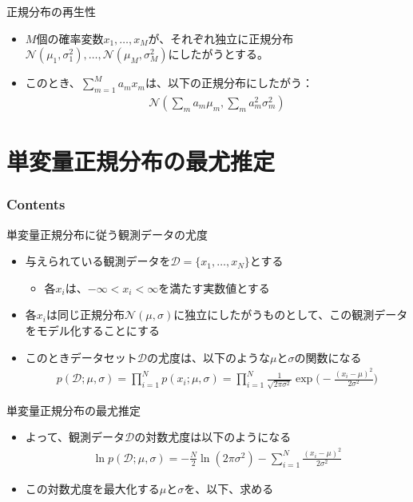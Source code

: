 \documentclass[aspectratio=169,unicode,dvipdfmx,14pt]{beamer}
\begin{document}
\begin{frame}{正規分布の再生性}
\begin{itemize}
\item $M$個の確率変数$x_1,\ldots,x_M$が、それぞれ独立に正規分布$\mathcal{N}(\mu_1,\sigma_1^2), 
\ldots, \mathcal{N}(\mu_M,\sigma_M^2)$にしたがうとする。
\item このとき、$\sum_{m=1}^M a_m x_m$は、以下の正規分布にしたがう：
\begin{align}
\mathcal{N}(\sum_m a_m \mu_m, \sum_m a_m^2 \sigma_m^2)
\end{align}
\end{itemize}
\end{frame}

\section{単変量正規分布の最尤推定}

\begin{frame}\frametitle{Contents}
\Large \tableofcontents[currentsection]
\end{frame}

\begin{frame}{単変量正規分布に従う観測データの尤度}
\begin{itemize}
\item 与えられている観測データを$\mathcal{D}=\{x_1,\ldots,x_N\}$とする
\begin{itemize}
\item 各$x_i$は、$-\infty < x_i < \infty$を満たす実数値とする
\end{itemize}
\item 各$x_i$は同じ正規分布$\mathcal{N}(\mu,\sigma)$に独立にしたがうものとして、この観測データをモデル化することにする
\item このときデータセット$\mathcal{D}$の尤度は、以下のような$\mu$と$\sigma$の関数になる
\begin{align}
p(\mathcal{D};\mu,\sigma)=\prod_{i=1}^N p(x_i;\mu,\sigma)
=\prod_{i=1}^N \frac{1}{\sqrt{2\pi\sigma^2}}\exp\bigg( - \frac{(x_i - \mu)^2}{2\sigma^2}\bigg)
\end{align}
\end{itemize}
\end{frame}


\begin{frame}{単変量正規分布の最尤推定}
\begin{itemize}
\item よって、観測データ$\mathcal{D}$の対数尤度は以下のようになる
\begin{align}
\ln p(\mathcal{D};\mu,\sigma)
= -\frac{N}{2}\ln(2\pi\sigma^2) - \sum_{i=1}^N \frac{(x_i - \mu)^2}{2\sigma^2}
\end{align}
\item この対数尤度を最大化する$\mu$と$\sigma$を、以下、求める
\end{itemize}
\end{frame}
\end{document}
